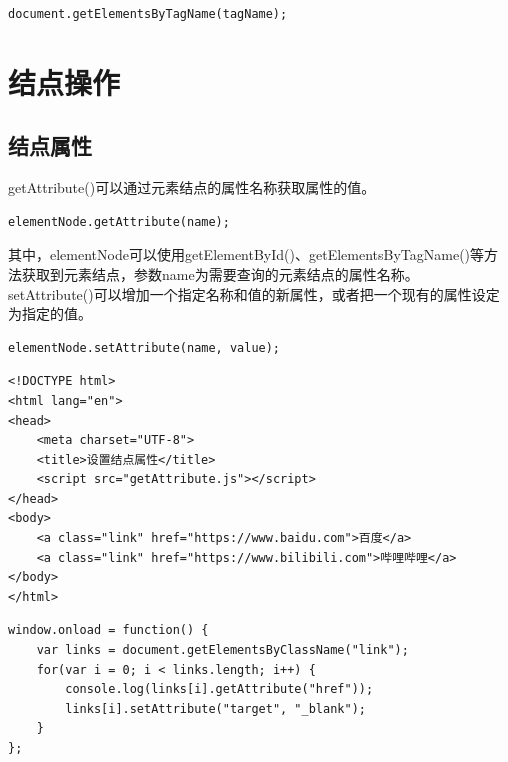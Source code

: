 \begin{lstlisting}[style=htmlcssjs]
document.getElementsByTagName(tagName);
\end{lstlisting}

\newpage

\section{结点操作}

\subsection{结点属性}

getAttribute()可以通过元素结点的属性名称获取属性的值。\\

\begin{lstlisting}[style=htmlcssjs]
elementNode.getAttribute(name);
\end{lstlisting}

其中，elementNode可以使用getElementById()、getElementsByTagName()等方法获取到元素结点，参数name为需要查询的元素结点的属性名称。\\

setAttribute()可以增加一个指定名称和值的新属性，或者把一个现有的属性设定为指定的值。\\

\begin{lstlisting}[style=htmlcssjs]
elementNode.setAttribute(name, value);
\end{lstlisting}

\vspace{0.5cm}


\begin{lstlisting}[style=htmlcssjs, title=getAttribute.html]
<!DOCTYPE html>
<html lang="en">
<head>
    <meta charset="UTF-8">
    <title>设置结点属性</title>
    <script src="getAttribute.js"></script>
</head>
<body>
    <a class="link" href="https://www.baidu.com">百度</a>
    <a class="link" href="https://www.bilibili.com">哔哩哔哩</a>
</body>
</html>
\end{lstlisting}

\begin{lstlisting}[style=htmlcssjs, title=getAttribute.js]
window.onload = function() {
    var links = document.getElementsByClassName("link");
    for(var i = 0; i < links.length; i++) {
        console.log(links[i].getAttribute("href"));
        links[i].setAttribute("target", "_blank");
    }
};
\end{lstlisting}


